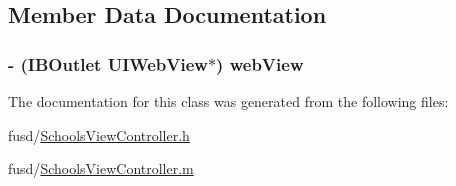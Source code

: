\subsection{\-Member \-Data \-Documentation}
\hypertarget{interface_schools_view_controller_a170c50cecd5a1bdf2ea3dacbb9fa4a1d}{
\subsubsection[{web\-View}]{\setlength{\rightskip}{0pt plus 5cm}-\/ (\-I\-B\-Outlet \-U\-I\-Web\-View$\ast$) {\bf web\-View}}}
\label{interface_schools_view_controller_a170c50cecd5a1bdf2ea3dacbb9fa4a1d}


\-The documentation for this class was generated from the following files\-:\begin{DoxyCompactItemize}
\item 
fusd/\hyperlink{_schools_view_controller_8h}{\-Schools\-View\-Controller.\-h}\item 
fusd/\hyperlink{_schools_view_controller_8m}{\-Schools\-View\-Controller.\-m}\end{DoxyCompactItemize}
